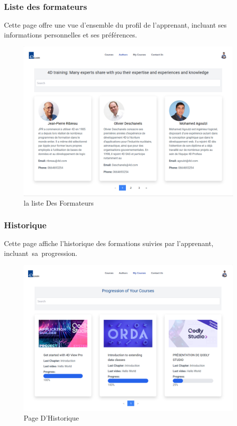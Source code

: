 \subsubsection{Liste des formateurs}

Cette page offre une vue d'ensemble du profil de l'apprenant, incluant ses informations personnelles et ses préférences.

\begin{figure}[H]
    \centering
    \includegraphics[width=19cm]{Figures/authors.png}
    \caption{la liste Des Formateurs}
\end{figure}

\subsubsection{Historique}

Cette page affiche l’historique des formations suivies par l’apprenant, incluant sa progression.

\begin{figure}[H]
    \centering
    \includegraphics[width=19cm]{Figures/historique.png}
    \caption{ Page D'Historique}
\end{figure}

